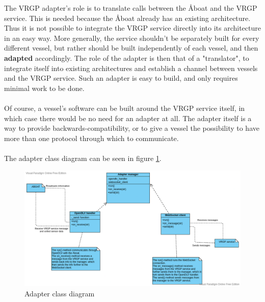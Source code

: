 The VRGP adapter's role is to translate calls between the Åboat and the VRGP service. This is needed because the Åboat already has an existing architecture. Thus it is not possible to integrate the VRGP service directly into its architecture in an easy way. More generally, the service shouldn't be separately built for every different vessel, but rather should be built independently of each vessel, and then \textbf{adapted} accordingly. The role of the adapter is then that of a "translator", to integrate itself into existing architectures and establish a channel between vessels and the VRGP service. Such an adapter is easy to build, and only requires minimal work to be done.
\\\\
Of course, a vessel's software can be built around the VRGP service itself, in which case there would be no need for an adapter at all. The adapter itself is a way to provide backwards-compatibility, or to give a vessel the possibility to have more than one protocol through which to communicate.
\\\\
The adapter class diagram can be seen in figure \ref{fig:adapter-class-diagram}.

\begin{figure}[ht]
	\centering
	\includegraphics[width=\linewidth]{diagrams/ClassDiagramAdapter}
	\caption{Adapter class diagram}
	\label{fig:adapter-class-diagram}
\end{figure}
